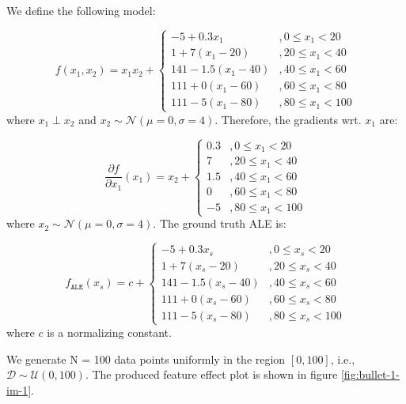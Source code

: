 \documentclass{article}
\begin{document}
We define the following model:

\begin{equation} \label{eq:bullet-1-model}
  f(x_1, x_2) = x_1x_2 +
  \begin{cases}
    -5  + 0.3 x_1 &,  0  \leq x_1 < 20 \\
    1   + 7  (x_1 - 20) &,  20 \leq x_1 < 40 \\
    141 - 1.5(x_1 - 40) &,  40 \leq x_1 < 60 \\
    111 + 0  (x_1 - 60) &,  60 \leq x_1 < 80 \\
    111 - 5  (x_1 - 80) &,  80 \leq x_1 < 100
  \end{cases}
\end{equation}
%
where \(x_1 \perp x_2\) and \(x_2 \sim \mathcal{N}(\mu=0, \sigma=4)\).
Therefore, the gradients wrt. \(x_1\) are:

\begin{equation} \label{eq:bullet-1-data-effect}
  \frac{\partial f}{ \partial x_1} (x_1) = x_2 +
  \begin{cases}
    0.3 &,  0  \leq x_1 < 20 \\
    7   &,  20 \leq x_1 < 40 \\
    1.5 &,  40 \leq x_1 < 60 \\
    0   &,  60 \leq x_1 < 80 \\
    -5  &,  80 \leq x_1 < 100
  \end{cases}
\end{equation}
%
where \(x_2 \sim \mathcal{N}(\mu=0, \sigma=4)\). The ground truth ALE is:

\begin{equation} \label{eq:bullet-1-gt-ale}
  f_{\mathtt{ALE}}(x_s) = c +
  \begin{cases}
    -5  + 0.3 x_s &,  0  \leq x_s < 20 \\
    1   + 7  (x_s - 20) &,  20 \leq x_s < 40 \\
    141 - 1.5(x_s - 40) &,  40 \leq x_s < 60 \\
    111 + 0  (x_s - 60) &,  60 \leq x_s < 80 \\
    111 - 5  (x_s - 80) &,  80 \leq x_s < 100
  \end{cases}
\end{equation}
%
where \(c\) is a normalizing constant.

We generate N = 100 data points uniformly in the region \([0,100]\),
i.e., \(\mathcal{D} \sim \mathcal{U}(0, 100)\). The produced feature
effect plot is shown in figure \ref{fig:bullet-1-im-1}.
\end{document}
